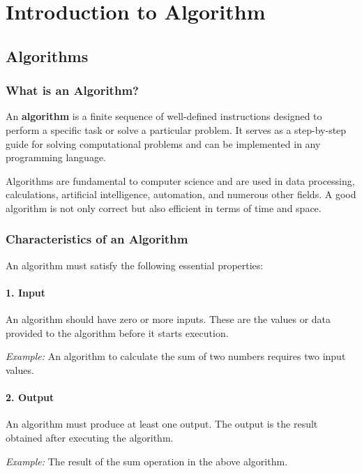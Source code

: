 \chapter{Introduction to Algorithm}

\section*{\Large \textbf{Algorithms}}

\subsection*{\large \textbf{What is an Algorithm?}}

An \textbf{algorithm} is a finite sequence of well-defined instructions designed to perform a specific task or solve a particular problem. It serves as a step-by-step guide for solving computational problems and can be implemented in any programming language.

Algorithms are fundamental to computer science and are used in data processing, calculations, artificial intelligence, automation, and numerous other fields. A good algorithm is not only correct but also efficient in terms of time and space.

\subsection*{\large \textbf{Characteristics of an Algorithm}}

An algorithm must satisfy the following essential properties:

\subsubsection*{\textbf{1. Input}}
An algorithm should have zero or more inputs. These are the values or data provided to the algorithm before it starts execution.

\textit{Example:} An algorithm to calculate the sum of two numbers requires two input values.

\subsubsection*{\textbf{2. Output}}
An algorithm must produce at least one output. The output is the result obtained after executing the algorithm.

\textit{Example:} The result of the sum operation in the above algorithm.

